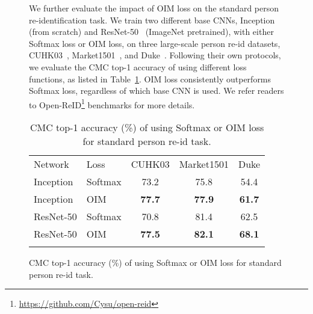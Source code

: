 \documentclass[10pt,twocolumn,letterpaper]{article}
\begin{document}
\begin{figure}[t]
\begin{center}
We further evaluate the impact of OIM loss on the standard person re-identification task. We train two different base CNNs, Inception~\cite{xiao2016learning} (from scratch) and ResNet-50~\cite{he2015deep} (ImageNet pretrained), with either Softmax loss or OIM loss, on three large-scale person re-id datasets, CUHK03~\cite{li2014deepreid}, Market1501~\cite{zheng2015scalable}, and Duke~\cite{zheng2017unlabeled,ristani2016MTMC}. Following their own protocols, we evaluate the CMC top-1 accuracy of using different loss functions, as listed in Table~\ref{tab:oim-reid}. OIM loss consistently outperforms Softmax loss, regardless of which base CNN is used. We refer readers to Open-ReID\footnote{\url{https://github.com/Cysu/open-reid}} benchmarks for more details.
\setlength{\tabcolsep}{8pt}
\begin{table}
\small
\begin{center}
\begin{tabular}{llccc}
\hline\noalign{\smallskip}
\noalign{\smallskip}
Network & Loss & CUHK03 & Market1501 & Duke \\
\noalign{\smallskip}\hline\hline\noalign{\smallskip}
Inception & Softmax & 73.2 & 75.8 & 54.4 \\
Inception & OIM & \textbf{77.7} & \textbf{77.9} & \textbf{61.7} \\
\hline\noalign{\smallskip}
ResNet-50 & Softmax & 70.8 & 81.4 & 62.5 \\
ResNet-50 & OIM & \textbf{77.5} & \textbf{82.1} & \textbf{68.1} \\
\hline\noalign{\smallskip}
\end{tabular}
\end{center}
\vspace{-3ex}
\caption{CMC top-1 accuracy (\%) of using Softmax or OIM loss for standard person re-id task.}
\vspace{-1ex}
\label{tab:oim-reid}
\end{table}
\setlength{\tabcolsep}{6pt}


\end{center}
\end{figure}
\end{document}
